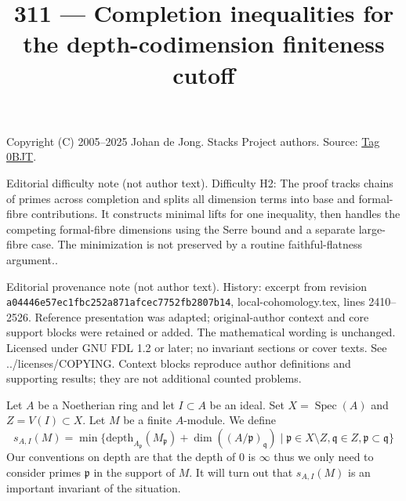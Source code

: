 \documentclass{amsart}
\theoremstyle{plain}
\theoremstyle{definition}
\theoremstyle{remark}
\numberwithin{equation}{subsection}
\def\Spec{\mathop{\mathrm{Spec}}}
\begin{document}
\title[Stacks Project, Tag 0BJT]{311 --- Completion inequalities for the depth-codimension finiteness cutoff}
\maketitle
\noindent Copyright (C) 2005--2025 Johan de Jong. Stacks Project authors. Source: \href{https://stacks.math.columbia.edu/tag/0BJT}{Tag 0BJT}.

\noindent Editorial difficulty note (not author text). Difficulty H2: The proof tracks chains of primes across completion and splits all dimension terms into base and formal-fibre contributions. It constructs minimal lifts for one inequality, then handles the competing formal-fibre dimensions using the Serre bound and a separate large-fibre case. The minimization is not preserved by a routine faithful-flatness argument..

\noindent Editorial provenance note (not author text). History: excerpt from revision \texttt{a0444\allowbreak 6e57e\allowbreak c1fbc\allowbreak 252a8\allowbreak 71afc\allowbreak ec775\allowbreak 2fb28\allowbreak 07b14}, local-cohomology.tex, lines 2410--2526. Reference presentation was adapted; original-author context and core support blocks were retained or added. The mathematical wording is unchanged. Licensed under GNU FDL 1.2 or later; no invariant sections or cover texts. See ../licenses/COPYING. Context blocks reproduce author definitions and supporting results; they are not additional counted problems.

\medskip\noindent
Let $A$ be a Noetherian ring and let $I \subset A$ be an ideal.
Set $X = \Spec(A)$ and $Z = V(I) \subset X$. Let $M$ be a finite $A$-module.
We define
\begin{equation}
\label{equation-cutoff}
s_{A, I}(M) =
\min \{
\text{depth}_{A_\mathfrak p}(M_\mathfrak p) + \dim((A/\mathfrak p)_\mathfrak q)
\mid
\mathfrak p \in X \setminus Z, \mathfrak q \in Z,
\mathfrak p \subset \mathfrak q
\}
\end{equation}
Our conventions on depth are that the depth of $0$ is $\infty$
thus we only need to consider primes $\mathfrak p$ in the support
of $M$. It will turn out that $s_{A, I}(M)$ is an important invariant of
the situation.
\end{document}
